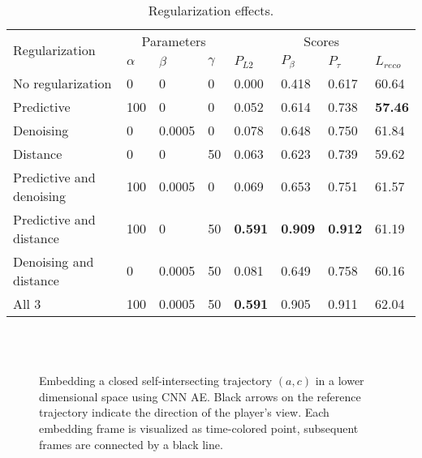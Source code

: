\begin{table}
\begin{center}
    \begin{tabular}{| l | l | l | l | l | l | l | l |}
    \hline
    \multirow{2}{*}{Regularization}      &\multicolumn{3}{|c|}{Parameters} & \multicolumn{4}{|c|}{Scores}  \\   \cline{2-8}

     & $\alpha$ & $\beta$ & $\gamma$    &  $P_{L2}$ & $P_{\beta}$ & $P_{\tau}$ & $L_{reco}$ \\ \hline

		No regularization 	& 0    & 0 & 0 & 0.000 & 0.418 & 0.617 & 60.64 \\ \hline
		Predictive          & 100  & 0 & 0 & 0.052 & 0.614 & 0.738 &  \textbf{57.46} \\
		Denoising           & 0    & 0.0005 & 0 & 0.078 & 0.648 & 0.750 & 61.84 \\
		Distance            & 0    & 0 & 50 & 0.063 & 0.623 & 0.739 & 59.62 \\ \hline
    Predictive and denoising 	& 100    & 0.0005 & 0 & 0.069 & 0.653 & 0.751 & 61.57 \\
    Predictive and distance  & 100    & 0 & 50 & \textbf{0.591} & \textbf{0.909} & \textbf{0.912} & 61.19 \\
    Denoising and distance  & 0    & 0.0005 & 50 & 0.081 & 0.649 & 0.758 & 60.16 \\ \hline
    All 3 & 100    & 0.0005 & 50 & \textbf{0.591} & 0.905 & 0.911 & 62.04 \\ \hline
    \end{tabular}
\end{center}
  \caption{Regularization effects.}
  \label{tab:8emb}
\end{table}

\begin{figure}[t!]
	\centering

	\\
  \\
    	\caption{Embedding a closed self-intersecting trajectory $(a, c)$ in a lower dimensional space using CNN AE. Black arrows on the reference trajectory indicate the direction of the player's view. Each embedding frame is visualized as time-colored point, subsequent frames are connected by a black line.}
    	\label{fig:model_param}
\end{figure}

